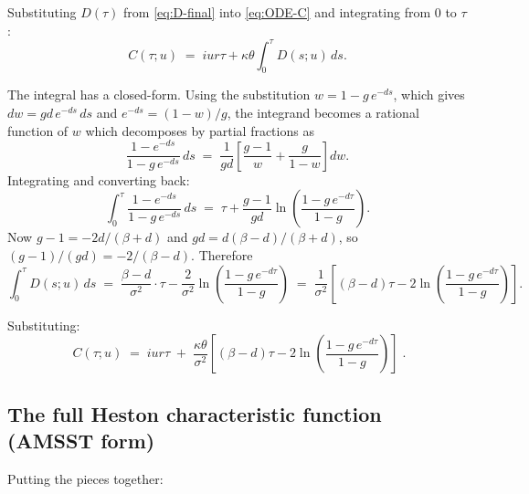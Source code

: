 \documentclass[11pt]{article}
\theoremstyle{plain}
\theoremstyle{definition}
\theoremstyle{remark}
\begin{document}
Substituting \(D(\tau)\) from \eqref{eq:D-final} into \eqref{eq:ODE-C} and integrating from \(0\) to \(\tau\):
\[
    C(\tau; u) \;=\; i u r \tau + \kappa\theta \int_0^\tau D(s; u)\, ds.
\]

The integral has a closed-form. Using the substitution \(w = 1 - g\, e^{-d s}\), which gives \(dw = g d\, e^{-d s}\, ds\) and \(e^{-d s} = (1 - w)/g\), the integrand becomes a rational function of \(w\) which decomposes by partial fractions as
\[
    \frac{1 - e^{-d s}}{1 - g\, e^{-d s}}\, ds \;=\; \frac{1}{g d}\!\left[\frac{g - 1}{w} + \frac{g}{1 - w}\right] dw.
\]
Integrating and converting back:
\[
    \int_0^\tau \frac{1 - e^{-d s}}{1 - g\, e^{-d s}}\, ds \;=\; \tau + \frac{g - 1}{g d} \ln\!\left(\frac{1 - g\, e^{-d \tau}}{1 - g}\right).
\]
Now \(g - 1 = -2 d/(\beta + d)\) and \(g d = d (\beta - d)/(\beta + d)\), so \((g - 1)/(g d) = -2/(\beta - d)\). Therefore
\[
    \int_0^\tau D(s; u)\, ds \;=\; \frac{\beta - d}{\sigma^2} \cdot \tau - \frac{2}{\sigma^2} \ln\!\left(\frac{1 - g\, e^{-d\tau}}{1 - g}\right) \;=\; \frac{1}{\sigma^2}\!\left[(\beta - d)\tau - 2 \ln\!\left(\frac{1 - g\, e^{-d\tau}}{1 - g}\right)\right].
\]

Substituting:
\begin{equation}
    \boxed{\;
    C(\tau; u) \;=\; i u r \tau \;+\; \frac{\kappa \theta}{\sigma^2}\!\left[(\beta - d)\tau - 2 \ln\!\left(\frac{1 - g\, e^{-d\tau}}{1 - g}\right)\right]\;.                                                                  \label{eq:C-final}
    }
\end{equation}

\subsection{The full Heston characteristic function (AMSST form)}

Putting the pieces together:
\end{document}
